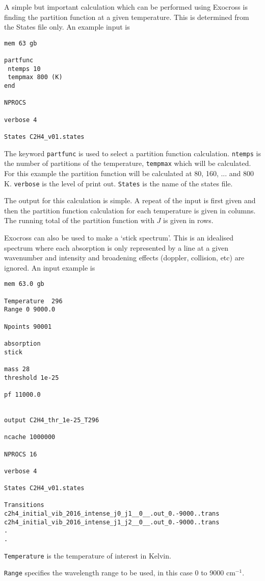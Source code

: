 A simple but important calculation which can be performed using Exocross is finding the partition function at a given 
temperature. This is determined from the States file only. An example input is
\begin{verbatim}
mem 63 gb

partfunc
 ntemps 10
 tempmax 800 (K)
end

NPROCS

verbose 4

States C2H4_v01.states
\end{verbatim}
The keyword \verb|partfunc| is used to select a partition function calculation. 
\verb|ntemps| is the number of partitions of the temperature, \verb|tempmax| which will be calculated. 
For this example the partition function will be calculated at 80, 160, ... and 800 K. 
\verb|verbose| is the level of print out. \verb|States| is the name of the states file.

The output for this calculation is simple. A repeat of the input is first given and then the partition function calculation
for each temperature is given in columns. The running total of the partition function with $J$ is given in rows. 



Exocross can also be used to make a `stick spectrum'. This is an idealised spectrum where each absorption is only
represented by a line at a given wavenumber and intensity and broadening effects (doppler, collision, etc) are ignored.
An input example is
\begin{verbatim}
mem 63.0 gb

Temperature  296
Range 0 9000.0

Npoints 90001

absorption
stick

mass 28
threshold 1e-25

pf 11000.0


output C2H4_thr_1e-25_T296

ncache 1000000

NPROCS 16

verbose 4

States C2H4_v01.states

Transitions
c2h4_initial_vib_2016_intense_j0_j1__0__.out_0.-9000..trans
c2h4_initial_vib_2016_intense_j1_j2__0__.out_0.-9000..trans
.
.
\end{verbatim}
\verb|Temperature| is the temperature of interest in Kelvin. 

\verb|Range| specifies the wavelength range to be used,
in this case 0 to 9000 cm$^{-1}$. 

